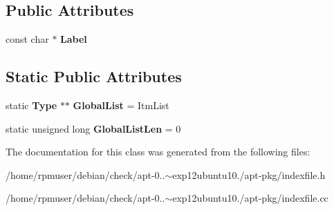 \subsection*{\-Public \-Attributes}
\begin{DoxyCompactItemize}
\item 
const char $\ast$ {\bfseries \-Label}\label{classpkgIndexFile_1_1Type_a2c28600dbc88e9535c6e44b111829cc2}

\end{DoxyCompactItemize}
\subsection*{\-Static \-Public \-Attributes}
\begin{DoxyCompactItemize}
\item 
static {\bf \-Type} $\ast$$\ast$ {\bfseries \-Global\-List} = \-Itm\-List\label{classpkgIndexFile_1_1Type_a879977043c4f20338ce9dadd63026f63}

\item 
static unsigned long {\bfseries \-Global\-List\-Len} = 0\label{classpkgIndexFile_1_1Type_acdd1750df964c2a94afe622abfe15d7b}

\end{DoxyCompactItemize}


\-The documentation for this class was generated from the following files\-:\begin{DoxyCompactItemize}
\item 
/home/rpmuser/debian/check/apt-\/0..$\sim$exp12ubuntu10./apt-\/pkg/indexfile.\-h\item 
/home/rpmuser/debian/check/apt-\/0..$\sim$exp12ubuntu10./apt-\/pkg/indexfile.\-cc\end{DoxyCompactItemize}
